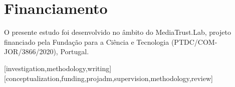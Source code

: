 \documentclass[portuguese]{textolivre}
\begin{document}
\section{Financiamento}
O presente estudo foi desenvolvido no âmbito do MediaTrust.Lab, projeto financiado pela Fundação para a Ciência e Tecnologia (PTDC/COM-JOR/3866/2020), Portugal.



\printbibliography\label{sec-bib}


\begin{contributors}
[investigation,methodology,writing]
[conceptualization,funding,projadm,supervision,methodology,review]
\end{contributors}
\end{document}
